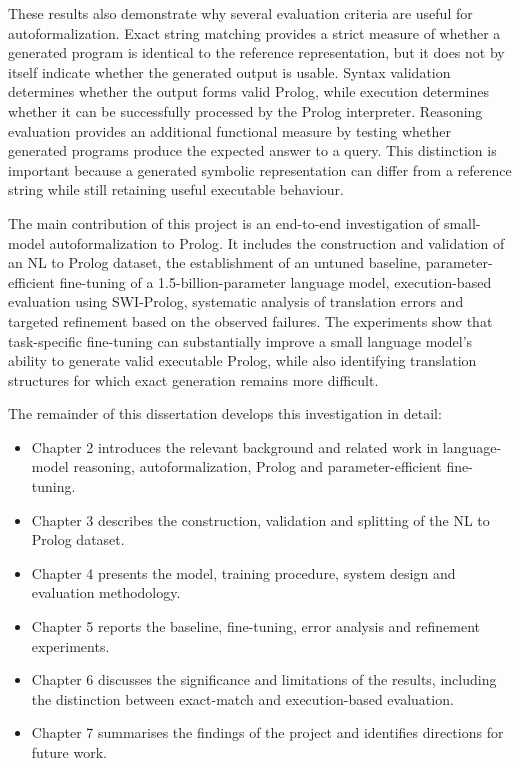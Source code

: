 \documentclass[11pt]{article} %
\theoremstyle{plain}
\theoremstyle{definition}
\begin{document}
These results also demonstrate why several evaluation criteria are useful for
autoformalization. Exact string matching provides a strict measure of whether a
generated program is identical to the reference representation, but it does not
by itself indicate whether the generated output is usable. Syntax validation
determines whether the output forms valid Prolog, while execution determines
whether it can be successfully processed by the Prolog interpreter. Reasoning
evaluation provides an additional functional measure by testing whether
generated programs produce the expected answer to a query. This distinction is
important because a generated symbolic representation can differ from a
reference string while still retaining useful executable behaviour.

The main contribution of this project is an end-to-end investigation of
small-model autoformalization to Prolog. It includes the construction and
validation of an NL to Prolog dataset, the establishment of an untuned baseline,
parameter-efficient fine-tuning of a 1.5-billion-parameter language model,
execution-based evaluation using SWI-Prolog, systematic analysis of translation
errors and targeted refinement based on the observed failures. The experiments
show that task-specific fine-tuning can substantially improve a small language
model's ability to generate valid executable Prolog, while also identifying
translation structures for which exact generation remains more difficult.

The remainder of this dissertation develops this investigation in detail:

\begin{itemize}
    \item Chapter 2 introduces the relevant background and related work in
    language-model reasoning, autoformalization, Prolog and
    parameter-efficient fine-tuning.

    \item Chapter 3 describes the construction, validation and splitting of
    the NL to Prolog dataset.

    \item Chapter 4 presents the model, training procedure, system design and
    evaluation methodology.

    \item Chapter 5 reports the baseline, fine-tuning, error analysis and
    refinement experiments.

    \item Chapter 6 discusses the significance and limitations of the results,
    including the distinction between exact-match and execution-based
    evaluation.

    \item Chapter 7 summarises the findings of the project and identifies
    directions for future work.
\end{itemize}
\end{document}
